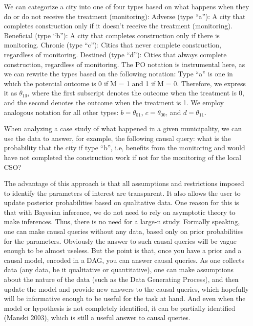\documentclass[]{AEA}
\begin{document}
We can categorize a city into one of four types based on what happens
when they do or do not receive the treatment (monitoring): Adverse (type
``a''): A city that completes construction only if it doesn't receive
the treatment (monitoring). Beneficial (type ``b''): A city that
completes construction only if there is monitoring. Chronic (type
``c''): Cities that never complete construction, regardless of
monitoring. Destined (type ``d''): Cities that always complete
construction, regardless of monitoring. The PO notation is instrumental
here, as we can rewrite the types based on the following notation: Type
``a'' is one in which the potential outcome is 0 if M = 1 and 1 if M =
0. Therefore, we express it as \(\theta_{10}\), where the first
subscript denotes the outcome when the treatment is 0, and the second
denotes the outcome when the treatment is 1. We employ analogous
notation for all other types: \(b = \theta_{01}\), \(c = \theta_{00}\),
and \(d = \theta_{11}\).

When analyzing a case study of what happened in a given municipality, we
can use the data to answer, for example, the following causal query:
what is the probability that the city if type ``b'', i.e, benefits from
the monitoring and would have not completed the construction work if not
for the monitoring of the local CSO?

The advantage of this approach is that all assumptions and restrictions
imposed to identify the parameters of interest are transparent. It also
allows the user to update posterior probabilities based on qualitative
data. One reason for this is that with Bayesian inference, we do not
need to rely on asymptotic theory to make inferences. Thus, there is no
need for a large-n study. Formally speaking, one can make causal queries
without any data, based only on prior probabilities for the parameters.
Obviously the answer to such causal queries will be vague enough to be
almost useless. But the point is that, once you have a prior and a
causal model, encoded in a DAG, you can answer causal queries. As one
collects data (any data, be it qualitative or quantitative), one can
make assumptions about the nature of the data (such as the Data
Generating Process), and then update the model and provide new answers
to the causal queries, which hopefully will be informative enough to be
useful for the task at hand. And even when the model or hypothesis is
not completely identified, it can be partially identified (Manski 2003),
which is still a useful answer to causal queries.
\end{document}
